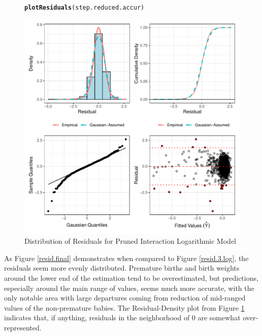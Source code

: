 \documentclass{article}\usepackage[]{graphicx}\usepackage[]{xcolor}
\makeatletter
\def\maxwidth{ %
  \ifdim\Gin@nat@width>\linewidth
    \linewidth
  \else
    \Gin@nat@width
  \fi
}
\newcommand{\hlstd}[1]{\textcolor[rgb]{0.345,0.345,0.345}{#1}}%
\newcommand{\hlkwd}[1]{\textcolor[rgb]{0.737,0.353,0.396}{\textbf{#1}}}%
\newenvironment{kframe}{%
 \def\at@end@of@kframe{}%
 \ifinner\ifhmode%
  \def\at@end@of@kframe{\end{minipage}}%
  \begin{minipage}{\columnwidth}%
 \fi\fi%
 \def\FrameCommand##1{\hskip\@totalleftmargin \hskip-\fboxsep
 \colorbox{shadecolor}{##1}\hskip-\fboxsep
     \hskip-\linewidth \hskip-\@totalleftmargin \hskip\columnwidth}%
 \MakeFramed {\advance\hsize-\width
   \@totalleftmargin\z@ \linewidth\hsize
   \@setminipage}}%
 {\par\unskip\endMakeFramed%
 \at@end@of@kframe}
\newenvironment{knitrout}{}{} %
\makeatother
\begin{document}
\begin{figure}
\begin{knitrout}
\color{fgcolor}\begin{kframe}
\begin{alltt}
\hlkwd{plotResiduals}\hlstd{(step.reduced.accur)}
\end{alltt}
\end{kframe}
\includegraphics[width=\maxwidth]{figure/unnamed-chunk-32-1} 
\end{knitrout}
\caption{Distribution of Residuals for Pruned Interaction Logarithmic Model}
\label{resid.plots.final}
\end{figure}

As Figure \ref{resid.final} demonstrates when compared to Figure \ref{resid.3.log}, the residuals seem more evenly distributed. Premature births and birth weights around the lower end of the estimation tend to be overestimated, but predictions, especially around the main range of values, seems much more accurate, with the only notable area with large departures coming from reduction of mid-ranged values of the non-premature babies. The Residual-Density plot from Figure \ref{resid.plots.final} indicates that, if anything, residuals in the neighborhood of 0 are somewhat over-represented.
\end{document}
